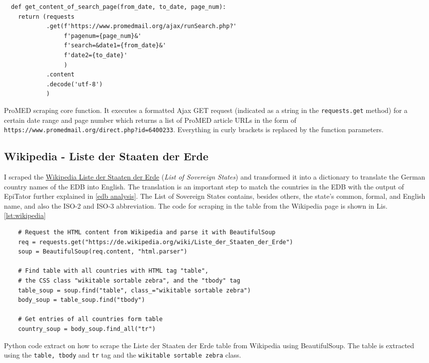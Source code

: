 \begin{listing}[h!]
  \begin{verbatim}
  def get_content_of_search_page(from_date, to_date, page_num):
    return (requests
            .get(f'https://www.promedmail.org/ajax/runSearch.php?'
                 f'pagenum={page_num}&'
                 f'search=&date1={from_date}&'
                 f'date2={to_date}'
                 )
            .content
            .decode('utf-8')
            )
  \end{verbatim}
  \caption{ProMED scraping core function. It executes a formatted Ajax GET request (indicated as a string in the \texttt{requests.get} method) for a certain date range and page number which returns a list of ProMED article URLs in the form of \textquotesingle \texttt{https://www.promedmail.org/direct.php?id=6400233}\textquotesingle. Everything in curly brackets is replaced by the function parameters.}
  \label{lst:promed}
\end{listing}

\subsection{Wikipedia - Liste der Staaten der Erde}\label{wikipedia}
I scraped the \href{https://de.wikipedia.org/wiki/Liste_der_Staaten_der_Erde}{Wikipedia Liste der Staaten der Erde} (\textit{List of Sovereign States}) and transformed it into a dictionary to translate the German country names of the EDB into English. The translation is an important step to match the countries in the EDB with the output of EpiTator further explained in \ref{edb analysis}. The List of Sovereign States contains, besides others, the state's common, formal, and English name, and also the ISO-2 and ISO-3 abbreviation.
The code for scraping in the table from the Wikipedia page is shown in Lis. \ref{lst:wikipedia}

\begin{listing}[h]
  \begin{verbatim}
    # Request the HTML content from Wikipedia and parse it with BeautifulSoup
    req = requests.get("https://de.wikipedia.org/wiki/Liste_der_Staaten_der_Erde")
    soup = BeautifulSoup(req.content, "html.parser")

    # Find table with all countries with HTML tag "table",
    # the CSS class "wikitable sortable zebra", and the "tbody" tag
    table_soup = soup.find("table", class_="wikitable sortable zebra")
    body_soup = table_soup.find("tbody")

    # Get entries of all countries form table
    country_soup = body_soup.find_all("tr")
  \end{verbatim}
  \caption{Python code extract on how to scrape the Liste der Staaten der Erde table from Wikipedia using BeautifulSoup. The table is extracted using the \texttt{table, tbody} and \texttt{tr} tag and the \texttt{wikitable sortable zebra} class.}
  \label{lst:wikipedia}
\end{listing}

